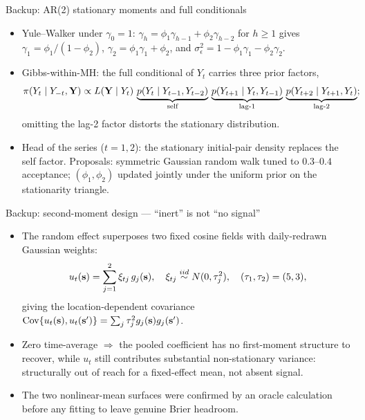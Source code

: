 \documentclass[12pt, aspectratio=169]{beamer}
\begin{document}
\begin{frame}{Backup: AR(2) stationary moments and full conditionals}
  \begin{itemize}
    \item Yule--Walker under $\gamma_0 = 1$:
          $\gamma_h = \phi_1 \gamma_{h-1} + \phi_2 \gamma_{h-2}$ for
          $h \ge 1$ gives $\gamma_1 = \phi_1 / (1 - \phi_2)$,
          $\gamma_2 = \phi_1 \gamma_1 + \phi_2$, and
          $\sigma^2_\epsilon = 1 - \phi_1 \gamma_1 - \phi_2 \gamma_2$.
    \item Gibbs-within-MH: the full conditional of $Y_t$ carries \alert{three}
          prior factors,
          \begin{equation*}
            \pi(Y_t \mid Y_{-t}, \mbox{\bf Y}) \propto L(\mbox{\bf Y} \mid Y_t)\,
            \underbrace{p(Y_t \mid Y_{t-1}, Y_{t-2})}_{\text{self}}\,
            \underbrace{p(Y_{t+1} \mid Y_t, Y_{t-1})}_{\text{lag-1}}\,
            \underbrace{p(Y_{t+2} \mid Y_{t+1}, Y_t)}_{\text{lag-2}};
          \end{equation*}
          omitting the lag-2 factor distorts the stationary distribution.
    \item Head of the series ($t = 1, 2$): the stationary initial-pair density
          replaces the self factor.  Proposals: symmetric Gaussian random walk
          tuned to $0.3$--$0.4$ acceptance; $(\phi_1, \phi_2)$ updated jointly
          under the uniform prior on the stationarity triangle.
  \end{itemize}
\end{frame}

\begin{frame}{Backup: second-moment design --- ``inert'' is not ``no signal''}
  \begin{itemize}
    \item The random effect superposes two fixed cosine fields with
          daily-redrawn Gaussian weights:
          \begin{equation*}
            u_t(\mbox{\bf s}) = \sum_{j=1}^{2} \xi_{tj}\, g_j(\mbox{\bf s}), \quad
            \xi_{tj} \stackrel{iid}{\sim} N(0, \tau_j^2), \quad
            (\tau_1, \tau_2) = (5, 3),
          \end{equation*}
          giving the location-dependent covariance
          $\mathrm{Cov}\{u_t(\mbox{\bf s}), u_t(\mbox{\bf s}')\}
           = \sum_j \tau_j^2 g_j(\mbox{\bf s}) g_j(\mbox{\bf s}')$.
    \item Zero time-average $\Rightarrow$ the pooled coefficient has
          \alert{no first-moment structure to recover}, while $u_t$ still
          contributes substantial non-stationary variance: structurally out of
          reach for a fixed-effect mean, not absent signal.
    \item The two nonlinear-mean surfaces were confirmed by an \alert{oracle
          calculation before any fitting} to leave genuine Brier headroom.
  \end{itemize}
\end{frame}
\end{document}
